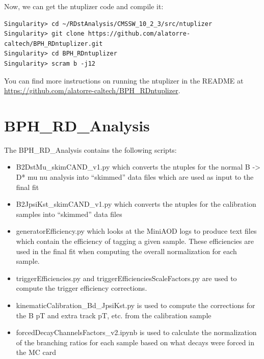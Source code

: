 \documentclass[12pt]{report}
\begin{document}
Now, we can get the ntuplizer code and compile it:
\begin{mdframed}[backgroundcolor=light-gray, roundcorner=10pt,leftmargin=1, rightmargin=1, innerleftmargin=15, innertopmargin=15,innerbottommargin=15, outerlinewidth=1, linecolor=light-gray,roundcorner=20pt]
\begin{lstlisting}
Singularity> cd ~/RDstAnalysis/CMSSW_10_2_3/src/ntuplizer
Singularity> git clone https://github.com/alatorre-caltech/BPH_RDntuplizer.git
Singularity> cd BPH_RDntuplizer
Singularity> scram b -j12
\end{lstlisting}
\end{mdframed}

You can find more instructions on running the ntuplizer in the README at \url{https://github.com/alatorre-caltech/BPH_RDntuplizer}.

\section{BPH\_RD\_Analysis}
The BPH\_RD\_Analysis contains the following scripts:
\begin{itemize}
\item B2DstMu\_skimCAND\_v1.py which converts the ntuples for the normal B -> D* mu nu analysis into ``skimmed'' data files which are used as input to the final fit
\item B2JpsiKst\_skimCAND\_v1.py which converts the ntuples for the calibration samples into ``skimmed'' data files
\item generatorEfficiency.py which looks at the MiniAOD logs to produce text files which contain the efficiency of tagging a given sample. These efficiencies are used in the final fit when computing the overall normalization for each sample.
\item triggerEfficiencies.py and triggerEfficienciesScaleFactors.py are used to compute the trigger efficiency corrections.
\item kinematicCalibration\_Bd\_JpsiKst.py is used to compute the corrections for the B pT and extra track pT, etc. from the calibration sample
\item forcedDecayChannelsFactors\_v2.ipynb is used to calculate the normalization of the branching ratios for each sample based on what decays were forced in the MC card
\end{itemize}
\end{document}
